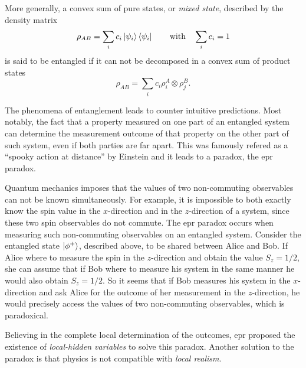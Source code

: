 More generally, a convex sum of pure states, or \textit{mixed state}, described by the density matrix
\begin{equation}
	\rho_{AB} = \sum_i c_i \ket{\psi_i} \bra{\psi_i} \qquad \text{with} \quad \sum_i c_i = 1
	\label{eq:mixed_state}
\end{equation}
is said to be entangled if it can not be decomposed in a convex sum of product states
\begin{equation}
	\rho_{AB} = \sum_i c_i \rho^A_i \otimes \rho^B_j.
	\label{eq:product_state}
\end{equation}

\medbreak

The phenomena of entanglement leads to counter intuitive predictions. 
Most notably, the fact that a property measured on one part of an entangled system can determine the measurement outcome of that property on the other part of such system, even if both parties are far apart. 
This was famously refered as a \enquote{spooky action at distance} by Einstein and it leads to a paradox, the \acrshort{epr} paradox.

Quantum mechanics imposes that the values of two non-commuting observables can not be known simultaneously. 
For example, it is impossible to both exactly know the spin value in the $x$-direction and in the $z$-direction of a system, since these two spin observables do not commute.
The \acrshort{epr} paradox occurs when measuring such non-commuting observables on an entangled system.
Consider the entangled state $\ket{\phi^+}$, described above, to be shared between Alice and Bob.
If Alice where to measure the spin in the $z$-direction and obtain the value $S_z = 1/2$, she can assume that if Bob where to measure his system in the same manner he would also obtain $S_z = 1/2$. 
So it seems that if Bob measures his system in the $x$-direction and ask Alice for the outcome of her measurement in the $z$-direction, he would precisely access the values of two non-commuting observables, which is paradoxical.

Believing in the complete local determination of the outcomes, \acrlong{epr} proposed the existence of \textit{local-hidden variables} to solve this paradox. Another solution to the paradox is that physics is not compatible with \textit{local realism}.

